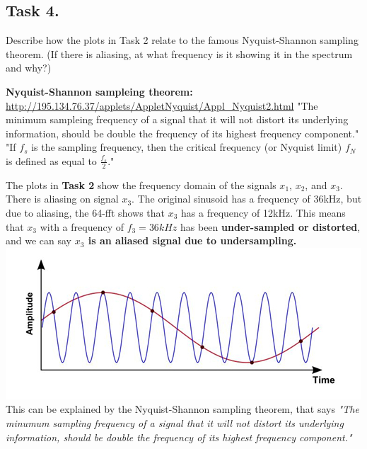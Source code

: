 \documentclass{article}
\begin{document}
    \subsection{Task 4.} Describe how the plots in Task 2 relate to the famous Nyquist-Shannon sampling theorem. (If there is aliasing, at what frequency is it showing it in the spectrum and why?)\\
        \vspace{5mm}
        \begin{center}
            \textbf{\Large{Nyquist-Shannon sampleing theorem:}}\\
            \url{http://195.134.76.37/applets/AppletNyquist/Appl_Nyquist2.html}
            "The minimum sampleing frequency of a signal that it will not distort its underlying information, should be double the frequency of its highest frequency component."
            \newline
            "If $f_s$ is the sampling frequency, then the critical frequency (or Nyquist limit) $f_N$ is defined as equal to $\frac{f_s}{2}$."
        \end{center}
        \vspace{5mm}
        The plots in \textbf{Task 2} show the frequency domain of the signals $x_1$, $x_2$, and $x_3$.
        There is aliasing on signal $x_3$. The original sinusoid has a frequency of 36kHz, but due to aliasing, the 64-fft shows that $x_3$ has a frequency of 12kHz. This means that $x_3$ with a frequency of $f_3=36kHz$ has been \textbf{under-sampled or distorted}, and we can say \textbf{$x_3$ is an aliased signal due to undersampling.}
        \includegraphics[width=\textwidth]{aliasing.jpg}
        \newline\newline
        This can be explained by the Nyquist-Shannon sampling theorem, that says \textit{"The minumum sampling frequency of a signal that it will not distort its underlying information, should be double the frequency of its highest frequency component."}
\end{document}
